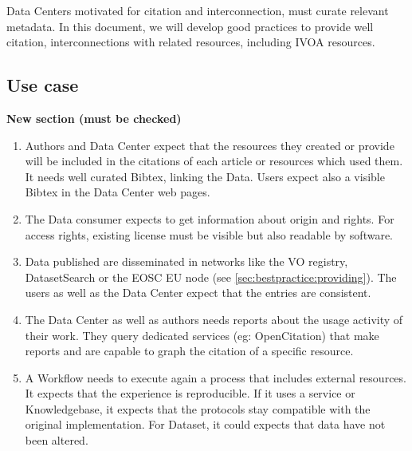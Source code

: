 \documentclass[11pt,a4paper]{ivoa}
\begin{document}

Data Centers motivated for citation and interconnection, must curate relevant metadata. 
In this document, we will develop good practices to provide well citation, interconnections with related resources, including IVOA resources.


\subsection{Use case}
\textbf{\color{red}New section (must be checked)}

\begin{enumerate}
	\item Authors and Data Center expect that the resources they created or provide will be included in the citations of each article or resources which used them. It needs well curated Bibtex, linking the Data. Users expect also a visible Bibtex in the Data Center web pages.
	
	\item The Data consumer expects to get information about origin and rights. For access rights, existing license must be visible but also readable by software.
	
	\item Data published are disseminated in networks like the VO registry, DatasetSearch or the EOSC EU node (see \ref{sec:bestpractice:providing}). The users as well as the Data Center expect that the entries are consistent.
	
	\item The Data Center as well as authors needs reports about the usage activity of their work. They query dedicated services (eg: OpenCitation) that make reports and are capable to graph the citation of a specific resource.
	
	\item A Workflow needs to execute again a process that includes external resources. It expects that the experience is reproducible. If it uses a service or Knowledgebase, it expects that the protocols stay compatible with the original implementation. For Dataset, it could expects that data have not been altered. 
	
	
\end{enumerate}
\end{document}
